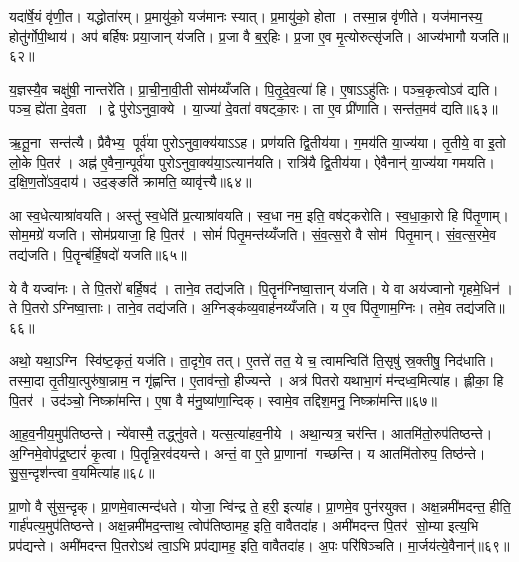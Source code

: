 यदा॑र्\mbox{}षे॒यं वृ॑णी॒त। यद्धोता॑रम्। प्र॒मायु॑को॒ यज॑मानः स्यात्। प्र॒मायु॑को॒ होता। तस्मा॒न्न वृ॑णीते। यज॑मानस्य॒ होतु॑र्गोपी॒थाय॑। अप॑ बर्\mbox{}हिषः प्रया॒जान् य॑जति। प्र॒जा वै ब॒र्॒हिः। प्र॒जा ए॒व मृ॒त्योरुत्सृ॑जति। आज्य॑भागौ यजति॥६२॥

य॒ज्ञस्यै॒व चक्षु॑षी॒ नान्तरे॑ति। प्रा॒ची॒ना॒वी॒ती सोम॑य्यँजति। पि॒तृ॒दे॒व॒त्या॑ हि। ए॒षाऽऽहु॑तिः। पञ्च॒कृत्वोऽव॑ द्यति। पञ्च॒ ह्ये॑ता दे॒वता। द्वे पु॑रोऽनुवा॒क्ये। या॒ज्या॑ दे॒वता॑ वषट्का॒रः। ता ए॒व प्री॑णाति। सन्त॑त॒मव॑ द्यति॥६३॥

ऋ॒तू॒ना सन्त॑त्यै। प्रैवैभ्य॒ पूर्व॑या पुरोऽनुवा॒क्य॑याऽऽह। प्रण॑यति द्वि॒तीय॑या। ग॒मय॑ति या॒ज्य॑या। तृ॒तीये॒ वा इ॒तो लो॒के पि॒तर॑। अह्न॑ ए॒वैना॒न्पूर्व॑या पुरोऽनुवा॒क्य॑या॒ऽत्यान॑यति। रात्रि॑यै द्वि॒तीय॑या। ऐवैनान्॑ या॒ज्य॑या गमयति। द॒क्षि॒ण॒तो॑ऽव॒दाय॑। उद॒ङ्ङति॑ क्रामति॒ व्यावृ॑त्त्यै॥६४॥

आ स्व॒धेत्याश्रा॑वयति। अस्तु॑ स्व॒धेति॑ प्र॒त्याश्रा॑वयति। स्व॒धा नम॒ इति॒ वष॑ट्करोति। स्व॒धा॒का॒रो हि पि॑तृ॒णाम्। सोम॒मग्रे॑ यजति। सोम॑प्रयाजा॒ हि पि॒तर॑। सोमं॑ पितृ॒मन्त॑य्यँजति। सं॒व॒त्स॒रो वै सोम॑ पितृ॒मान्। सं॒व॒त्स॒रमे॒व तद्य॑जति। पि॒तॄन्ब॑र्\mbox{}हि॒षदो॑ यजति॥६५॥

ये वै यज्वा॑नः। ते पि॒तरो॑ बर्\mbox{}हि॒षद॑। ताने॒व तद्य॑जति। पि॒तॄन॑ग्निष्वा॒त्तान् य॑जति। ये वा अय॑ज्वानो गृहमे॒धिन॑। ते पि॒तरोऽग्निष्वा॒त्ताः। ताने॒व तद्य॑जति। अ॒ग्निङ्क॑व्य॒वाह॑नय्यँजति। य ए॒व पि॑तृ॒णाम॒ग्निः। तमे॒व तद्य॑जति॥६६॥

अथो॒ यथा॒ऽग्नि स्वि॑ष्ट॒कृतं॒ यज॑ति। ता॒दृगे॒व तत्। ए॒तत्ते॑ तत॒ ये च॒ त्वामन्विति॑ ति॒सृषु॑ स्र॒क्तीषु॒ निद॑धाति। तस्मा॒दा तृ॒तीया॒त्पुरु॑षा॒न्नाम॒ न गृ॑ह्णन्ति। ए॒ताव॑न्तो॒ हीज्यन्ते। अत्र॑ पितरो यथाभा॒गं म॑न्दध्व॒मित्या॑ह। ह्लीका॒ हि पि॒तर॑। उद॑ञ्चो॒ निष्क्रा॑मन्ति। ए॒षा वै म॑नु॒ष्या॑णा॒न्दिक्। स्वामे॒व तद्दिश॒मनु॒ निष्क्रा॑मन्ति॥६७॥

आ॒ह॒व॒नीय॒मुप॑तिष्ठन्ते। न्ये॑वास्मै॒ तद्ध्नु॑वते। यत्स॒त्या॑हव॒नीये। अथा॒न्यत्र॒ चर॑न्ति। आतमि॑तो॒रुप॑तिष्ठन्ते। अ॒ग्निमे॒वोप॑द्र॒ष्टारं॑ कृ॒त्वा। पि॒तॄन्नि॒रव॑दयन्ते। अन्तं॒ वा ए॒ते प्रा॒णानां गच्छन्ति। य आतमि॑तोरुप॒ तिष्ठ॑न्ते। सु॒स॒न्दृश॑न्त्वा व॒यमित्या॑ह॥६८॥

प्रा॒णो वै सु॑स॒न्दृक्। प्रा॒णमे॒वात्मन्द॑धते। योजा॒ न्वि॑न्द्र ते॒ हरी॒ इत्या॑ह। प्रा॒णमे॒व पुन॑रयुक्त। अक्ष॒न्नमी॑मदन्त॒ हीति॒ गार्\mbox{}ह॑पत्य॒मुप॑तिष्ठन्ते। अक्ष॒न्नमी॑मद॒न्ताथ॒ त्वोप॑तिष्ठामह॒ इति॒ वावैतदा॑ह। अमी॑मदन्त पि॒तर॑ सो॒म्या इत्य॒भि प्रप॑द्यन्ते। अमी॑मदन्त पि॒तरोऽथ॑ त्वा॒ऽभि प्रप॑द्यामह॒ इति॒ वावैतदा॑ह। अ॒पः परि॑षिञ्चति। मा॒र्जय॑त्ये॒वैनान्॑॥६९॥

